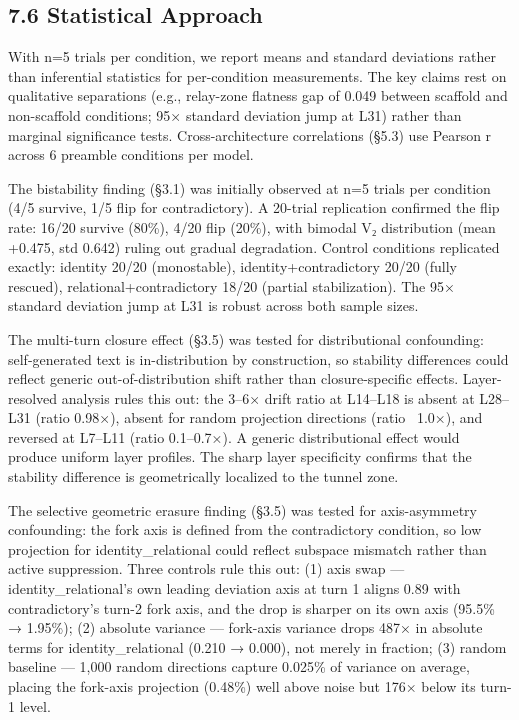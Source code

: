 \documentclass[12pt]{article}
\begin{document}
\subsection*{7.6 Statistical Approach}

With n=5 trials per condition, we report means and standard deviations rather than inferential statistics for per-condition measurements. The key claims rest on qualitative separations (e.g., relay-zone flatness gap of 0.049 between scaffold and non-scaffold conditions; 95× standard deviation jump at L31) rather than marginal significance tests. Cross-architecture correlations (§5.3) use Pearson r across 6 preamble conditions per model.

The bistability finding (§3.1) was initially observed at n=5 trials per condition (4/5 survive, 1/5 flip for contradictory). A 20-trial replication confirmed the flip rate: 16/20 survive (80\%), 4/20 flip (20\%), with bimodal V₂ distribution (mean +0.475, std 0.642) ruling out gradual degradation. Control conditions replicated exactly: identity 20/20 (monostable), identity+contradictory 20/20 (fully rescued), relational+contradictory 18/20 (partial stabilization). The 95× standard deviation jump at L31 is robust across both sample sizes.

The multi-turn closure effect (§3.5) was tested for distributional confounding: self-generated text is in-distribution by construction, so stability differences could reflect generic out-of-distribution shift rather than closure-specific effects. Layer-resolved analysis rules this out: the 3–6× drift ratio at L14–L18 is absent at L28–L31 (ratio 0.98×), absent for random projection directions (ratio ~1.0×), and reversed at L7–L11 (ratio 0.1–0.7×). A generic distributional effect would produce uniform layer profiles. The sharp layer specificity confirms that the stability difference is geometrically localized to the tunnel zone.

The selective geometric erasure finding (§3.5) was tested for axis-asymmetry confounding: the fork axis is defined from the contradictory condition, so low projection for identity\_relational could reflect subspace mismatch rather than active suppression. Three controls rule this out: (1) axis swap — identity\_relational's own leading deviation axis at turn 1 aligns 0.89 with contradictory's turn-2 fork axis, and the drop is sharper on its own axis (95.5\% → 1.95\%); (2) absolute variance — fork-axis variance drops 487× in absolute terms for identity\_relational (0.210 → 0.000), not merely in fraction; (3) random baseline — 1,000 random directions capture 0.025\% of variance on average, placing the fork-axis projection (0.48\%) well above noise but 176× below its turn-1 level.
\end{document}
